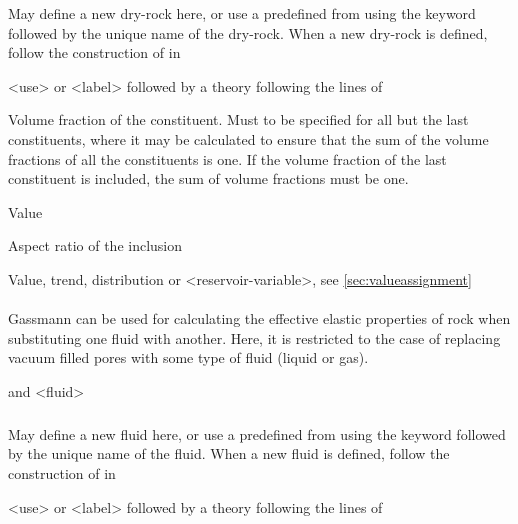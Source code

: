 {
 \slist
   \item \Description  May define a new dry-rock here, or use a predefined  from  using the keyword  followed by the unique name of the dry-rock. When a new dry-rock is defined, follow the construction of  in 
   \item \Argument <use> or <label> followed by a theory following the lines of 
   \item \Default
 \elist

 \slist
   \item \Description Volume fraction of the constituent. Must to be specified for all but the last constituents, where it may be calculated to ensure that the sum of the volume fractions of all the constituents is one. If the volume fraction of the last constituent is included, the sum of volume fractions must be one.
   \item \Argument Value
   \item \Default
 \elist

 \slist
   \item \Description Aspect ratio of the inclusion
   \item \Argument Value, trend, distribution or <reservoir-variable>, see \autoref{sec:valueassignment}
   \item \Default
 \elist

\paragraph{}
 \slist
   \item \Description Gassmann can be used for calculating the effective elastic properties of rock when substituting one fluid with another. Here, it is restricted to the case of replacing vacuum filled pores with some type of fluid (liquid or gas).
   \item {} and <fluid>
   \item \Default
 \elist

\subparagraph{}
 \slist
   \item \Description May define a new fluid here, or use a predefined  from  using the keyword  followed by the unique name of the fluid. When a new fluid is defined, follow the construction of  in 
   \item \Argument <use> or <label> followed by a theory following the lines of 
   \item \Default
 \elist

}

